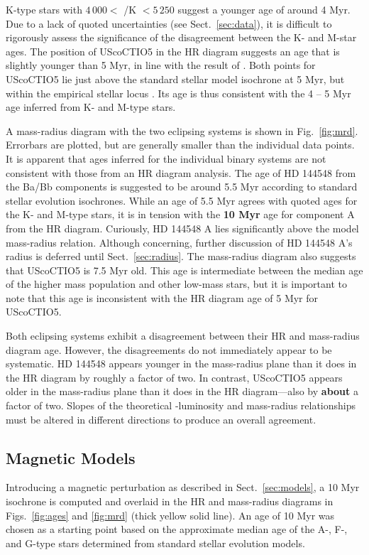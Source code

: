 \documentclass{aa}
\begin{document}
K-type stars with $4\,000 <$ \teff/K $< 5\,250$ suggest a younger age of around 4 Myr. Due to a lack of quoted uncertainties (see Sect.~\ref{sec:data}), it is difficult to rigorously assess the significance of the disagreement between the K- and M-star ages. The position of UScoCTIO5 in the HR diagram suggests an age that is slightly younger than 5 Myr, in line with the result of \citet{Kraus2015}. Both points for UScoCTIO5 lie just above the standard stellar model isochrone at 5 Myr, but within the empirical stellar locus \citep{Preibisch1999,Preibisch2002}. Its age is thus consistent with the 4 -- 5 Myr age inferred from K- and M-type stars.

A mass-radius diagram with the two eclipsing systems is shown in Fig.~\ref{fig:mrd}. Errorbars are plotted, but are generally smaller than the individual data points. It is apparent that ages inferred for the individual binary systems are not consistent with those from an HR diagram analysis. The age of HD 144548 from the Ba/Bb components is suggested to be around 5.5 Myr according to standard stellar evolution isochrones. While an age of 5.5 Myr agrees with quoted ages for the K- and M-type stars, it is in tension with the {\bf 10 Myr} age for component A from the HR diagram. Curiously, HD 144548 A lies significantly above the model mass-radius relation. Although concerning, further discussion of HD 144548 A's radius is deferred until Sect.~\ref{sec:radius}. The mass-radius diagram also suggests that UScoCTIO5 is 7.5 Myr old. This age is intermediate between the median age of the higher mass population and other low-mass stars, but it is important to note that this age is inconsistent with the HR diagram age of 5 Myr for UScoCTIO5. 

Both eclipsing systems exhibit a disagreement between their HR and mass-radius diagram age. However, the disagreements do not immediately appear to be systematic. HD 144548 appears younger in the mass-radius plane than it does in the HR diagram by roughly a factor of two. In contrast, UScoCTIO5 appears older in the mass-radius plane than it does in the HR diagram---also by {\bf about} a factor of two. Slopes of the theoretical \teff-luminosity and mass-radius relationships must be altered in different directions to produce an overall agreement.

\subsection{Magnetic Models}
Introducing a magnetic perturbation as described in Sect.~\ref{sec:models}, a 10 Myr isochrone is computed and overlaid in the HR and mass-radius diagrams in Figs.~\ref{fig:ages} and \ref{fig:mrd} (thick yellow solid line). An age of 10 Myr was chosen as a starting point based on the approximate median age of the A-, F-, and G-type stars determined from standard stellar evolution models. 
\end{document}
